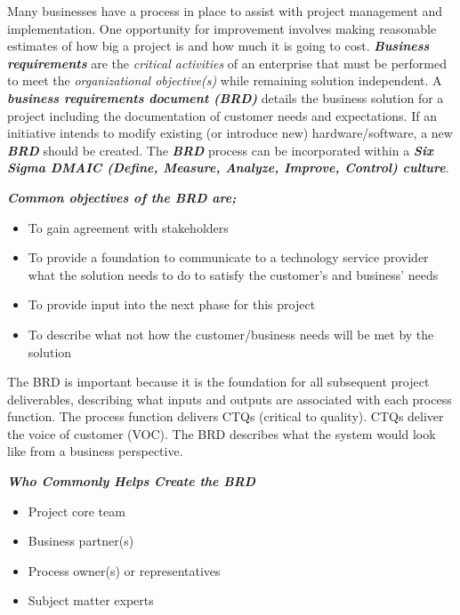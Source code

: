 \documentclass{article}
\begin{document}
\normalsize{

Many businesses have a process in place to assist with project management and implementation. One opportunity for improvement involves making reasonable estimates of how big a project is and how much it is going to cost. \textbf{\textit{Business requirements}} are the \textit{critical activities} of an enterprise that must be performed to meet the \textit{organizational objective(s)} while remaining solution independent. A \textbf{\textit{business requirements document (BRD)}} details the business solution for a project including the documentation of customer needs and expectations. If an initiative intends to modify existing (or introduce new) hardware/software, a new \textit{\textbf{BRD}} should be created. The \textit{\textbf{BRD}} process can be incorporated within a \textbf{\textit{Six Sigma DMAIC (Define, Measure, Analyze, Improve, Control) culture}}. 

\vspace{0.3cm}

\hspace{-0.66cm} \textbf{\textit{Common objectives of the \textit{\textbf{BRD}} are;}}

\begin{itemize}
    \item To gain agreement with stakeholders
    \item To provide a foundation to communicate to a technology service provider what the solution needs to do to satisfy the customer’s and business’ needs
    \item To provide input into the next phase for this project
    \item To describe what not how the customer/business needs will be met by the solution
\end{itemize}

The BRD is important because it is the foundation for all subsequent project deliverables, describing what inputs and outputs are associated with each process function. The process function delivers CTQs (critical to quality). CTQs deliver the voice of customer (VOC). The BRD describes what the system would look like from a business perspective. 

\vspace{0.3cm}

\hspace{-0.66cm} \textbf{\textit{Who Commonly Helps Create the BRD}} 

\begin{itemize}
    \item Project core team
    \item Business partner(s)
    \item Process owner(s) or representatives
    \item Subject matter experts 
\end{itemize}

}
\end{document}
